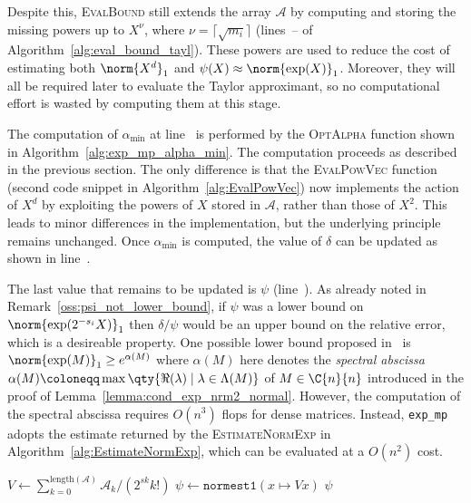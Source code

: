 Despite this, \textsc{EvalBound} still extends the array $\mathcal{A}$ by computing and storing the missing powers up to $X^{\nu}$, where $\nu=\lceil\sqrt{m_i}\rceil$ (lines~-- of Algorithm~\ref{alg:eval_bound_tayl}). These powers are used to reduce the cost of estimating both $\norm{X^d}_1$ and $\psi(X)\approx\norm{\exp(X)}_1$. Moreover, they will all be required later to evaluate the Taylor approximant, so no computational effort is wasted by computing them at this stage. 
\smallskip 

The computation of $\alpha_{\min}$ at line~ is performed by the \textsc{OptAlpha} function shown in Algorithm~\ref{alg:exp_mp_alpha_min}. The computation proceeds as described in the previous section. The only difference is that the \textsc{EvalPowVec} function (second code snippet in Algorithm~\ref{alg:EvalPowVec}) now implements the action of $X^{d}$ by exploiting the powers of $X$ stored in $\mathcal{A}$, rather than those of $X^2$. This leads to minor differences in the implementation, but the underlying principle remains unchanged.
Once $\alpha_{\min}$ is computed, the value of $\delta$ can be updated as shown in line~.
\smallskip 

The last value that remains to be updated is $\psi$ (line~). As already noted in Remark~\ref{oss:psi_not_lower_bound}, if $\psi$ was a lower bound on $\norm{\exp(2^{-s_i}X)}_1$ then $\delta/\psi$ would be an upper bound on the relative error, which is a desireable property. One possible lower bound proposed in~\cite{higham:hf19_mpexpm} is $\norm{\exp(M)}_1\ge e^{\alpha(M)}$ where $\alpha(M)$ here denotes the \emph{spectral abscissa} $\alpha(M)\coloneqq\max\qty{\Re(\lambda)\mid\lambda\in\Lambda(M)}$ of $M\in\C{n}{n}$ introduced in the proof of Lemma~\ref{lemma:cond_exp_nrm2_normal}. However, the computation of the spectral abscissa requires $O(n^3)$ flops for dense matrices. Instead, \texttt{exp\_mp} adopts the estimate returned by the \textsc{EstimateNormExp} in Algorithm~\ref{alg:EstimateNormExp}, which can be evaluated at a $O(n^2)$ cost.

\begin{algorithm}[htp]
	\caption{\emph{Function that estimates $\exp(2^{-s}X)$ by means of truncated Taylor series, using the matrix powers already present in $\mathcal{A}$.}}
	\label{alg:EstimateNormExp}
	\begin{algorithmic}[1]
		\State $V\gets\sum_{k=0}^{\text{length}(\mathcal{A})}\mathcal{A}_k/(2^{sk}k!)$
		\State $\psi\gets\mathtt{normest1}(x\mapsto Vx)$
		\State\Return $\psi$
	\end{algorithmic}
\end{algorithm}

